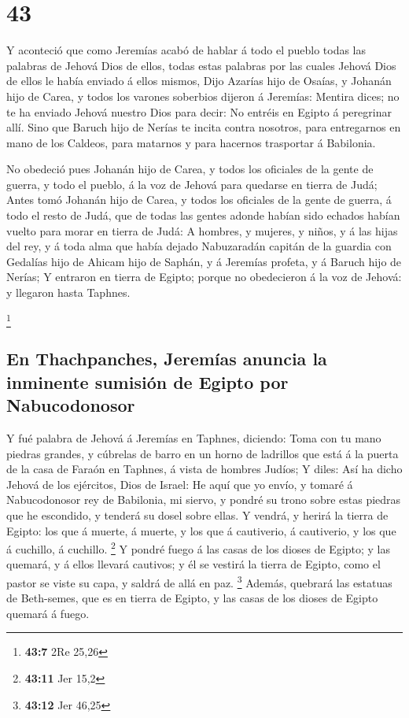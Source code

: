 \hypertarget{section-42}{%
\section{43}\label{section-42}}

 Y aconteció que como Jeremías acabó de hablar á todo el
pueblo todas las palabras de Jehová Dios de ellos, todas estas palabras
por las cuales Jehová Dios de ellos le había enviado á ellos mismos,
 Dijo Azarías hijo de Osaías, y Johanán hijo de Carea, y
todos los varones soberbios dijeron á Jeremías: Mentira dices; no te ha
enviado Jehová nuestro Dios para decir: No entréis en Egipto á
peregrinar allí.  Sino que Baruch hijo de Nerías te incita
contra nosotros, para entregarnos en mano de los Caldeos, para matarnos
y para hacernos trasportar á Babilonia.

 No obedeció pues Johanán hijo de Carea, y todos los
oficiales de la gente de guerra, y todo el pueblo, á la voz de Jehová
para quedarse en tierra de Judá;  Antes tomó Johanán hijo
de Carea, y todos los oficiales de la gente de guerra, á todo el resto
de Judá, que de todas las gentes adonde habían sido echados habían
vuelto para morar en tierra de Judá:  A hombres, y
mujeres, y niños, y á las hijas del rey, y á toda alma que había dejado
Nabuzaradán capitán de la guardia con Gedalías hijo de Ahicam hijo de
Saphán, y á Jeremías profeta, y á Baruch hijo de Nerías; 
Y entraron en tierra de Egipto; porque no obedecieron á la voz de
Jehová: y llegaron hasta Taphnes.

\footnote{\textbf{43:7} 2Re 25,26}

\hypertarget{en-thachpanches-jeremuxedas-anuncia-la-inminente-sumisiuxf3n-de-egipto-por-nabucodonosor}{%
\subsection{En Thachpanches, Jeremías anuncia la inminente sumisión de
Egipto por
Nabucodonosor}\label{en-thachpanches-jeremuxedas-anuncia-la-inminente-sumisiuxf3n-de-egipto-por-nabucodonosor}}

 Y fué palabra de Jehová á Jeremías en Taphnes, diciendo:
 Toma con tu mano piedras grandes, y cúbrelas de barro en
un horno de ladrillos que está á la puerta de la casa de Faraón en
Taphnes, á vista de hombres Judíos;  Y diles: Así ha
dicho Jehová de los ejércitos, Dios de Israel: He aquí que yo envío, y
tomaré á Nabucodonosor rey de Babilonia, mi siervo, y pondré su trono
sobre estas piedras que he escondido, y tenderá su dosel sobre ellas.
 Y vendrá, y herirá la tierra de Egipto: los que á
muerte, á muerte, y los que á cautiverio, á cautiverio, y los que á
cuchillo, á cuchillo. \footnote{\textbf{43:11} Jer 15,2} 
Y pondré fuego á las casas de los dioses de Egipto; y las quemará, y á
ellos llevará cautivos; y él se vestirá la tierra de Egipto, como el
pastor se viste su capa, y saldrá de allá en paz. \footnote{\textbf{43:12}
  Jer 46,25}  Además, quebrará las estatuas de
Beth-semes, que es en tierra de Egipto, y las casas de los dioses de
Egipto quemará á fuego.


